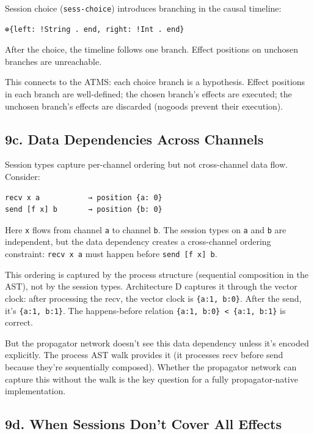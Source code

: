 \documentclass[11pt]{article}
\begin{document}
Session choice (\texttt{sess-choice}) introduces branching in the causal timeline:

\begin{verbatim}
⊕{left: !String . end, right: !Int . end}
\end{verbatim}

After the choice, the timeline follows one branch. Effect positions on unchosen
branches are unreachable.

This connects to the ATMS: each choice branch is a hypothesis. Effect positions
in each branch are well-defined; the chosen branch's effects are executed;
the unchosen branch's effects are discarded (nogoods prevent their execution).
\subsection{9c. Data Dependencies Across Channels}
\label{sec:org593e3c6}

Session types capture per-channel ordering but not cross-channel data flow.
Consider:

\begin{verbatim}
recv x a           → position {a: 0}
send [f x] b       → position {b: 0}
\end{verbatim}

Here \texttt{x} flows from channel \texttt{a} to channel \texttt{b}. The session types on \texttt{a} and \texttt{b}
are independent, but the data dependency creates a cross-channel ordering
constraint: \texttt{recv x a} must happen before \texttt{send [f x] b}.

This ordering is captured by the process structure (sequential composition in
the AST), not by the session types. Architecture D captures it through the
vector clock: after processing the recv, the vector clock is \texttt{\{a:1, b:0\}}.
After the send, it's \texttt{\{a:1, b:1\}}. The happens-before relation
\texttt{\{a:1, b:0\} < \{a:1, b:1\}} is correct.

But the propagator network doesn't see this data dependency unless it's
encoded explicitly. The process AST walk provides it (it processes recv before
send because they're sequentially composed). Whether the propagator network
can capture this without the walk is the key question for a fully
propagator-native implementation.
\subsection{9d. When Sessions Don't Cover All Effects}
\label{sec:orgc7ae8e6}
\end{document}
